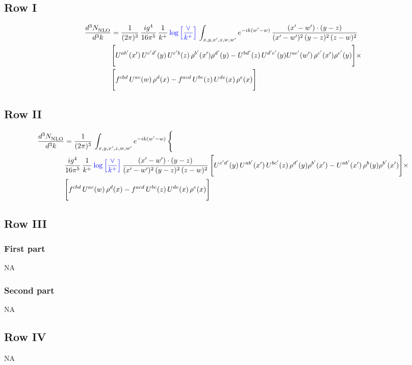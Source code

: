 \documentclass[9pt]{article}
\numberwithin{equation}{section}
\begin{document}
\subsection{Row I}
\begin{align}
     \frac{d^{3}N_{\rm NLO}^{\rm}}{d^{3}k}  & =  \frac{1}{(2\pi)^{3}}\,\frac{ig^{4}}{16\pi^{5}}\,\frac{1}{k^{+}}\,{\color{blue}\log{\left[\frac{\vee}{k^{+}}\right]}}\,\int_{x,y,x',z,w,w^{\prime}} e^{-ik(w^{\prime}-w)}\, \frac{(x'-w')\cdot (y-z)}{(x'-w')^{2}\,(y-z)^{2}\,(z-w)^{2}}\notag \\ &   \Bigg[U^{ab'}(x')\,U^{c'd'}(y)\,U^{c'b}(z)\,\rho^{b'}(x')\rho^{d'}(y)-U^{bd'}(z)\,U^{d'e'}(y)U^{ac'}(w')\,\rho^{c'}(x')\rho^{e'}(y)\Bigg]\times\notag \\ & \Bigg[f^{cbd}\,U^{ac}(w)\,\rho^{d}(x)-f^{acd}\, U^{bc}(z)\,U^{de}(x)\,\rho^{e}(x)\Bigg] 
\end{align}
\subsection{Row II}
\begin{align}
     \frac{d^{3}N_{\rm NLO}^{\rm}}{d^{3}k}  & =  \frac{1}{(2\pi)^{3}}\, \int_{x,y,x',z,w,w^{\prime}} e^{-ik(w^{\prime}-w)}\, \Bigg\{\notag \\ & \frac{ig^{4}}{16\pi^{5}}\,\frac{1}{k^{+}}\,{\color{blue}\log{\left[\frac{\vee}{k^{+}}\right]}}\, \frac{(x'-w')\cdot (y-z)}{(x'-w')^{2}\,(y-z)^{2}\,(z-w)^{2}}\,\Bigg[U^{c'd'}(y)\,U^{ab'}(x')\,U^{bc'}(z)\,\rho^{d'}(y)\rho^{b'}(x')-U^{ab'}(x')\,\rho^{b}(y)\rho^{b'}(x')\Bigg]\times\notag \\ & \Bigg[f^{cbd}\,U^{ac}(w)\,\rho^{d}(x)-f^{acd}\, U^{bc}(z)\,U^{de}(x)\,\rho^{e}(x)\Bigg]
\end{align}
 \subsection{Row III}
 \subsubsection{First part}
\textsc{NA}
\subsubsection{Second part}
\textsc{NA}
\subsection{Row IV}
\textsc{NA}
\end{document}

